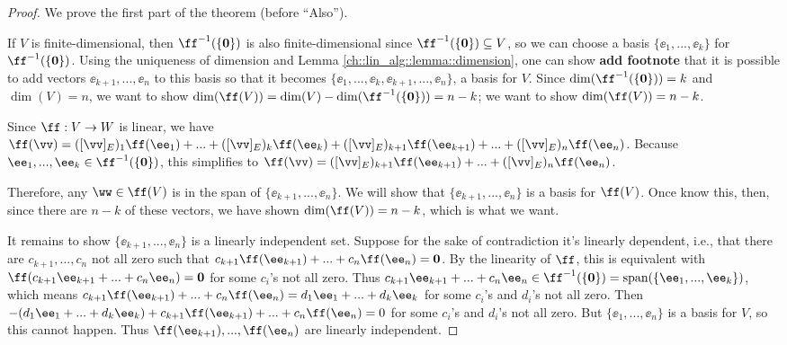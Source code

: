 \begin{proof}
    We prove the first part of the theorem (before ``Also'').
    
    If $V$ is finite-dimensional, then $\ff^{-1}(\{\mathbf{0}\})$ is also finite-dimensional since $\ff^{-1}(\{\mathbf{0}\}) \subseteq V$, so we can choose a basis $\{\ee_1, ..., \ee_k\}$ for $\ff^{-1}(\{\mathbf{0}\})$. Using the uniqueness of dimension and Lemma \ref{ch::lin_alg::lemma::dimension}, one can show \textbf{add footnote} that it is possible to add vectors $\ee_{k + 1}, ..., \ee_n$ to this basis so that it becomes $\{\ee_1, ..., \ee_k, \ee_{k + 1}, ..., \ee_n\}$, a basis for $V$. Since $\dim(\ff^{-1}(\{\mathbf{0}\})) = k$ and $\dim(V) = n$, we want to show $\dim(\ff(V)) = \dim(V) - \dim(\ff^{-1}(\{\mathbf{0}\})) = n - k$; we want to show $\dim(\ff(V)) = n - k$.

    Since $\ff:V \rightarrow W$ is linear, we have ${\ff(\vv) = ([\vv]_E)_1 \ff(\ee_1) + ... + ([\vv]_E)_k \ff(\ee_k) + ([\vv]_E)_{k + 1} \ff(\ee_{k + 1}) + ... + ([\vv]_E)_n \ff(\ee_n)}$. Because $\ee_1, ..., \ee_k \in \ff^{-1}(\{\mathbf{0}\})$, this simplifies to ${\ff(\vv) = ([\vv]_E)_{k + 1} \ff(\ee_{k + 1}) + ... + ([\vv]_E)_n \ff(\ee_n)}$. 
    
    Therefore, any $\ww \in \ff(V)$ is in the span of $\{\ee_{k + 1}, ..., \ee_n\}$. We will show that $\{\ee_{k + 1}, ..., \ee_n\}$ is a basis for $\ff(V)$. Once know this, then, since there are $n - k$ of these vectors, we have shown $\dim(\ff(V)) = n - k$, which is what we want.
    
    It remains to show $\{\ee_{k + 1}, ..., \ee_n\}$ is a linearly independent set. Suppose for the sake of contradiction it's linearly dependent, i.e., that there are $c_{k + 1}, ..., c_n$ not all zero such that $c_{k + 1} \ff(\ee_{k + 1}) + ... + c_n \ff(\ee_n) = \mathbf{0}$. By the linearity of $\ff$, this is equivalent with $\ff(c_{k + 1} \ee_{k + 1} + ... + c_n \ee_n) = \mathbf{0}$ for some $c_i$'s not all zero. Thus $c_{k + 1} \ee_{k + 1} + ... + c_n \ee_n \in \ff^{-1}(\{\mathbf{0}\}) = \spann(\{\ee_1, ..., \ee_k\})$, which means $c_{k + 1} \ff(\ee_{k + 1}) + ... + c_n \ff(\ee_n) = d_1 \ee_1 + ... + d_k \ee_k$ for some $c_i$'s and $d_i$'s not all zero. Then $-(d_1 \ee_1 + ... + d_k \ee_k) + c_{k + 1} \ff(\ee_{k + 1}) + ... + c_n \ff(\ee_n) = 0$ for some $c_i$'s and $d_i$'s not all zero. But $\{\ee_1, ..., \ee_n\}$ is a basis for $V$, so this cannot happen. Thus $\ff(\ee_{k + 1}), ..., \ff(\ee_n)$ are linearly independent.
\end{proof}

